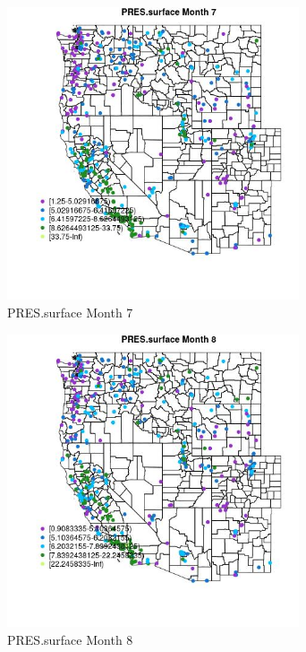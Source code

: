 \begin{figure} 
\centering  
\includegraphics[width=0.77\textwidth]{Code_Outputs/ML_input_report_ML_input_PM25_Step5_part_d_de_duplicated_aves_ML_input_MapObsMo7PRESsurface.jpg} 
\caption{\label{fig:ML_input_report_ML_input_PM25_Step5_part_d_de_duplicated_aves_ML_inputMapObsMo7PRESsurface}PRES.surface Month 7} 
\end{figure} 
 

\begin{figure} 
\centering  
\includegraphics[width=0.77\textwidth]{Code_Outputs/ML_input_report_ML_input_PM25_Step5_part_d_de_duplicated_aves_ML_input_MapObsMo8PRESsurface.jpg} 
\caption{\label{fig:ML_input_report_ML_input_PM25_Step5_part_d_de_duplicated_aves_ML_inputMapObsMo8PRESsurface}PRES.surface Month 8} 
\end{figure} 
 


